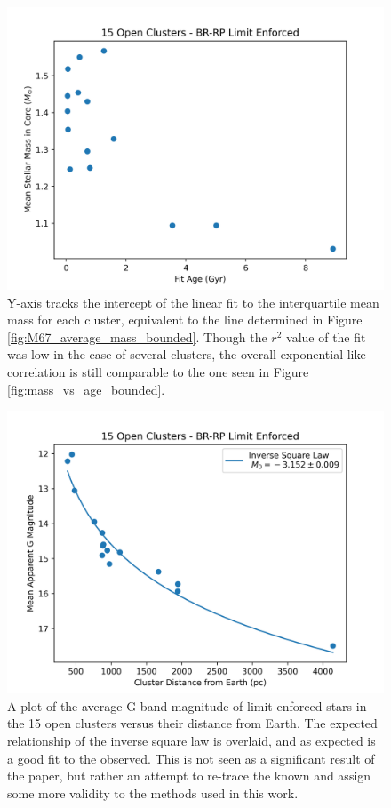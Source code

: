 \documentclass[onecolumn,table,xcdraw,super]{aastex631}
\begin{document}
\begin{figure}[]
    \centering
      \includegraphics[width=4.75in]{figures/mass_intercept_vs_age_bounded.png}
    \caption{Y-axis tracks the intercept of the linear fit to the interquartile mean mass for each cluster, equivalent to the line determined in Figure \ref{fig:M67_average_mass_bounded}. Though the  $r^2$ value of the fit was low in the case of several clusters, the overall exponential-like correlation is still comparable to the one seen in Figure \ref{fig:mass_vs_age_bounded}.}
    \label{fig:mass_intercept_bounded_vs_age}
\end{figure}

\begin{figure}[]
    \centering
      \includegraphics[width=4.75in]{figures/mag_vs_dist_bounded.png}
    \caption{A plot of the average G-band magnitude of limit-enforced stars in the 15 open clusters versus their distance from Earth. The expected relationship of the inverse square law is overlaid, and as expected is a good fit to the observed. This is not seen as a significant result of the paper, but rather an attempt to re-trace the known and assign some more validity to the methods used in this work.}
    \label{fig:mag_vs_dist_bounded}
\end{figure}
\end{document}
